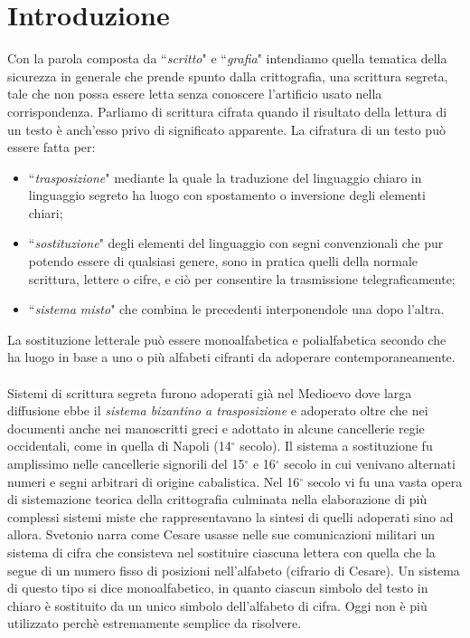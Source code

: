 \documentclass[a4paper,12pt]{tesiinfo}
\begin{document}
\maketitle
\contentspage
\chapter{Introduzione}
Con la parola composta da ``\textit{scritto}" e ``\textit{grafia}" intendiamo quella tematica della sicurezza in generale che prende spunto dalla crittografia, una scrittura segreta, tale che non possa essere letta senza conoscere l'artificio usato nella corrispondenza. Parliamo di scrittura cifrata quando il risultato della lettura di un testo \`e anch'esso privo di significato apparente. La cifratura di un testo pu\`o essere fatta per:
\begin{itemize}
    \item ``\textit{trasposizione}" mediante la quale la traduzione del linguaggio chiaro in linguaggio segreto ha luogo con spostamento o inversione degli elementi chiari;
    \item ``\textit{sostituzione}" degli elementi del linguaggio con segni convenzionali che pur potendo essere di qualsiasi genere, sono in pratica quelli della normale scrittura, lettere o cifre, e ci\`o per consentire la trasmissione telegraficamente;
    \item ``\textit{sistema misto}" che combina le precedenti interponendole una dopo l'altra.
\end{itemize} 
La sostituzione letterale pu\`o essere monoalfabetica e polialfabetica secondo che ha luogo in base a uno o pi\`u alfabeti cifranti da adoperare contemporaneamente.
\\
\\
Sistemi di scrittura segreta furono adoperati gi\`a nel Medioevo  dove larga diffusione ebbe il \textit{sistema bizantino a trasposizione} e adoperato oltre che nei documenti anche nei manoscritti greci e adottato in alcune cancellerie regie occidentali, come in quella di Napoli (14$^\circ$ secolo). Il sistema  a sostituzione  fu amplissimo nelle cancellerie signorili del 15$^\circ$ e 16$^\circ$ secolo in cui venivano alternati numeri e segni arbitrari di origine cabalistica. Nel 16$^\circ$ secolo vi fu una vasta opera di sistemazione teorica della crittografia culminata nella elaborazione di pi\`u complessi sistemi miste che rappresentavano la sintesi di quelli adoperati sino ad allora. 
Svetonio narra come Cesare usasse nelle sue comunicazioni militari un sistema di cifra che consisteva nel sostituire ciascuna lettera con quella che la segue di un numero fisso di posizioni nell'alfabeto (cifrario di Cesare). Un sistema di questo tipo si dice monoalfabetico, in quanto ciascun simbolo del testo in chiaro \`e sostituito da un unico simbolo dell'alfabeto di cifra. Oggi non \`e pi\`u utilizzato perch\`e estremamente semplice da risolvere.
\end{document}
